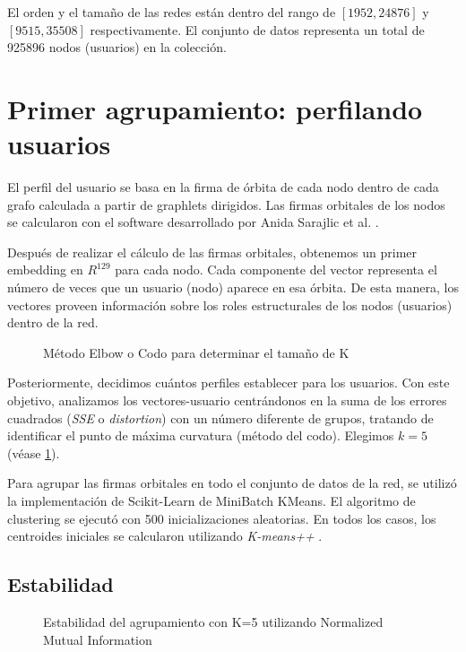 El orden y el tamaño de las redes están dentro del rango de $[1952,24876]$ y $[9515,35508]$ respectivamente. El conjunto de datos representa un total de 925896 nodos (usuarios) en la colección.

\section{Primer agrupamiento: perfilando usuarios}

El perfil del usuario se basa en la firma de órbita de cada nodo dentro de cada grafo calculada a partir de graphlets dirigidos. Las firmas orbitales de los nodos se calcularon con el software desarrollado por Anida Sarajlic et al. \cite{sarajlic_graphlet-based_2016}. 

Después de realizar el cálculo de las firmas orbitales, obtenemos un primer embedding en ${R}^{129}$ para cada nodo. Cada componente del vector representa el número de veces que un usuario (nodo) aparece en esa órbita. De esta manera, los vectores proveen información sobre los roles estructurales de los nodos (usuarios) dentro de la red.

 \begin{figure}[htbp]
   \centering
   
    \caption{Método Elbow o Codo para determinar el tamaño de K}
    \label{fig:elbowmethod}
\end{figure}

Posteriormente, decidimos cuántos perfiles establecer para los usuarios. Con este objetivo, analizamos los vectores-usuario centrándonos en la suma de los errores cuadrados (\textit{SSE} o \textit{distortion}) con un número diferente de grupos, tratando de identificar el punto de máxima curvatura (método del codo). Elegimos $k = 5$ (véase \ref{fig:elbowmethod}).

Para agrupar las firmas orbitales en todo el conjunto de datos de la red, se utilizó la implementación de Scikit-Learn de MiniBatch KMeans. El algoritmo de clustering se ejecutó con 500 inicializaciones aleatorias. En todos los casos, los centroides iniciales se calcularon utilizando \textit{K-means++} \cite{}. 

\subsection{Estabilidad}

 \begin{figure}[htbp]
   \centering
   
    \caption{Estabilidad del agrupamiento con K=5 utilizando Normalized Mutual Information}
    \label{fig:estability-NMI}
\end{figure}

